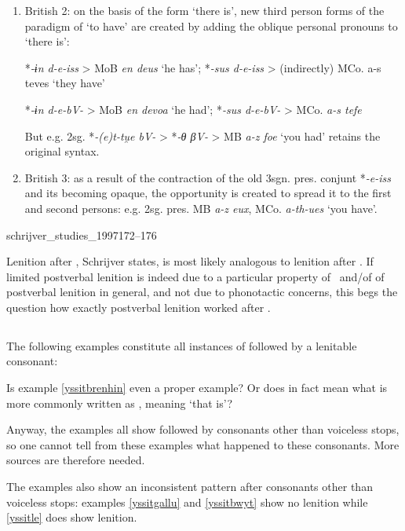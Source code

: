 {\begin{enumerate}
*\textit{issi-d-e} *\textit{ne-d-e-iss} (> MW \textit{yssit, nyt oes})
\item British 2: on the basis of the form `there is', new third person forms of the paradigm of `to have' are created by adding the oblique personal pronouns to `there is':

*\textit{-ɨn d-e-iss} > MoB \textit{en deus} `he has'; *\textit{-sus d-e-iss} > (indirectly) MCo. a-s teves `they have'

*\textit{-ɨn d-e-bV-} > MoB \textit{en devoa} `he had'; *\textit{-sus d-e-bV-} > MCo. \textit{a-s tefe}

But e.g. 2sg. *\textit{-(e)t-tu̯e bV-} > *\textit{-θ βV- }> MB \textit{a-z foe} `you had' retains the original syntax.
\item British 3: as a result of the contraction of the old 3sgn. pres. conjunt *\textit{-e-iss} and its becoming opaque, the opportunity is created to spread it to the first and second persons: e.g. 2sg. pres. MB \textit{a-z eux}, MCo. \textit{a-th-ues} `you have'.
\end{enumerate}
}{schrijver_studies_1997}{172--176}

Lenition after \oes, Schrijver states, is most likely analogous to lenition after . If limited postverbal lenition is indeed due to a particular property of \oes\ and/of of postverbal lenition in general, and not due to phonotactic concerns, this begs the question how exactly postverbal lenition worked after . 

\subsection{}
The following examples constitute all instances of  followed by a lenitable consonant:

 Is example \ref{yssitbrenhin} even a proper example? Or does  in fact mean what is more commonly written as , meaning `that is'?

Anyway, the examples all show  followed by consonants other than voiceless stops, so one cannot tell from these examples what happened to these consonants. More sources are therefore needed. 

The examples also show an inconsistent pattern after consonants other than voiceless stops: examples \ref{yssitgallu} and \ref{yssitbwyt} show no lenition while \ref{yssitle} does show lenition.
